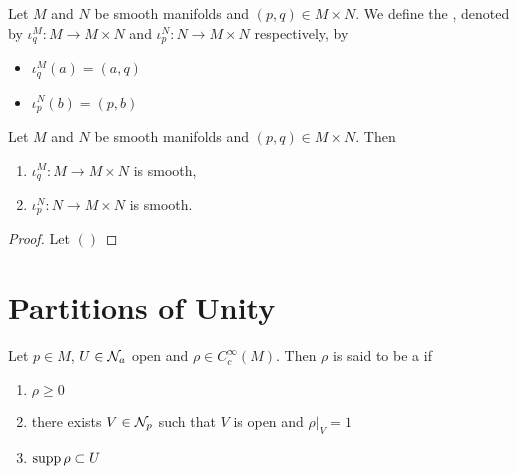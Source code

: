 \documentclass{book}
\begin{document}
\begin{defn} 
	Let $M$ and $N$ be smooth manifolds and $(p,q) \in M \times N$. We define the , denoted by $\iota^M_q: M \rightarrow M \times N$ and $\iota^N_p: N \rightarrow M \times N$ respectively, by 
	\begin{itemize}
		\item $\iota^M_q(a) = (a, q)$ 
		\item $\iota^N_p(b) = (p, b)$ 
	\end{itemize}
\end{defn}

\begin{ex} 
	Let $M$ and $N$ be smooth manifolds and $(p,q) \in M \times N$. Then
	\begin{enumerate}
		\item $\iota^M_q: M \rightarrow M \times N$ is smooth,
		\item $\iota^N_p: N \rightarrow M \times N$ is smooth.
	\end{enumerate}
\end{ex}

\begin{proof}
	Let $()$
\end{proof}













































\newpage 
\section{Partitions of Unity}

\begin{defn}
	Let $p \in M$, $U \in \mathcal{N}_a$ open and $\rho \in C_c^{\infty}(M)$. Then $\rho$ is said to be a  if 
	\begin{enumerate}
		\item $\rho \geq 0$ 
		\item there exists $V \in \mathcal{N}_p$ such that $V$ is open and $\rho|_V = 1$ 
		\item $\operatorname{supp} \rho \subset U$
	\end{enumerate}
\end{defn}
\end{document}
